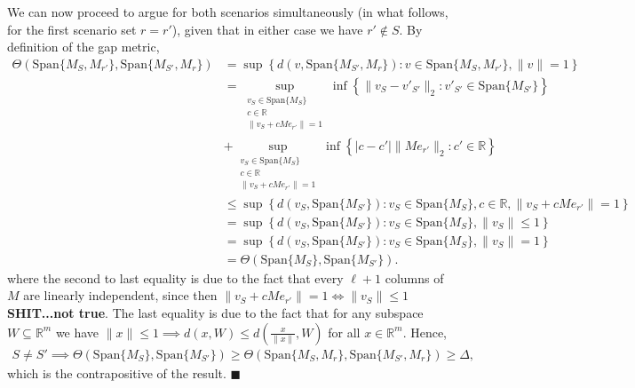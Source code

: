 \documentclass[journal,onecolumn]{IEEEtran}
\begin{document}
We can now proceed to argue for both scenarios simultaneously (in what follows, for the first scenario set $r = r'$), given that in either case we have $r' \notin S$. By definition of the gap metric,
\begin{align*}
\Theta(\text{Span}\{M_{S}, M_{r'}\}, \text{Span}\{M_{S'}, M_r\}) 
&= \sup \left\{ d(v,\text{Span}\{M_{S'},M_r\}) : v \in \text{Span}\{M_S,M_{r'}\}, \|v\| = 1 \right\} \\
&= \sup_{ \substack{ v_S \in \text{Span}\{M_S\} \\ c \in \mathbb{R} \\ \|v_S + cMe_{r'}\| = 1 } }\inf \left\{ \|v_S - v'_{S'} \|_2 : v'_{S'}\in \text{Span}\{M_{S'}\} \right\} \\
&+ \sup_{ \substack{ v_S \in \text{Span}\{M_S\} \\ c \in \mathbb{R} \\ \|v_S + cMe_{r'}\| = 1 } } \inf \left\{ |c-c'| \|Me_{r'}\|_2 : c' \in \mathbb{R} \right\} \\
&\leq \sup \left\{ d(v_S,\text{Span}\{M_{S'}\}) : v_S \in \text{Span}\{M_S\}, c \in \mathbb{R}, \|v_S + cMe_{r'}\| = 1 \right\} \\
&= \sup \left\{ d(v_S,\text{Span}\{M_{S'}\}) : v_S \in \text{Span}\{M_S\}, \|v_S\| \leq 1 \right\} \\
&= \sup \left\{ d(v_S,\text{Span}\{M_{S'}\}) : v_S \in \text{Span}\{M_S\}, \|v_S\| = 1 \right\} \\
&= \Theta(\text{Span}\{M_{S} \}, \text{Span}\{M_{S'}\}) .
\end{align*}
%
where the second to last equality is due to the fact that every $\ell+1$ columns of $M$ are linearly independent, since then $\|v_S+ cMe_{r'} \|=1 \iff \|v_S\| \leq 1$ \textbf{SHIT...not true}. The last equality is due to the fact that for any subspace $W \subseteq \mathbb{R}^m$ we have $\|x\| \leq 1 \implies d(x, W) \leq d(\frac{x}{\|x\|}, W)$ for all $x \in \mathbb{R}^m$. Hence,
\begin{align}
S \neq S' \implies \Theta(\text{Span}\{M_{S} \}, \text{Span}\{M_{S'}\}) \geq \Theta(\text{Span}\{M_{S}, M_{r}\}, \text{Span}\{M_{S'}, M_r\}) \geq \Delta,
\end{align}
%
which is the contrapositive of the result. \indent $\blacksquare$





\ifCLASSOPTIONcaptionsoff
  \newpage
\fi
\end{document}
